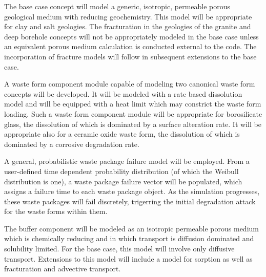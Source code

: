 


      The base case concept will model a generic, isotropic, permeable porous 
      geological medium with reducing geochemistry. This model will be 
      appropriate for clay and salt geologies. The fracturation in the geologies  
      of the granite and deep borehole concepts will not be appropriately 
      modeled in the base case unless an equivalent porous medium calculation is 
      conducted external to the code. The incorporation of fracture models will 
      follow in subsequent extensions to the base case.
  






      A waste form component module capable of modeling two canonical waste
      form concepts will be developed. It will be modeled with a rate based 
      dissolution model and will be equipped with a heat limit which may 
      constrict the waste form loading. Such a waste form component module will 
      be appropriate for borosilicate glass, the dissolution of which is 
      dominated by a surface alteration rate. It will be appropriate also for a 
      ceramic oxide waste form, the dissolution of which is dominated by a 
      corrosive degradation rate.


      
      A general, probabilistic waste package failure model will be employed.  
      From a user-defined time dependent probability distribution (of which the 
      Weibull distribution is one), a waste package failure vector will be 
      populated, which assigns a failure time to each waste package object. As 
      the simulation progresses, these waste packages will fail discretely, 
      trigerring the initial degradation attack for the waste forms within them.

      

      The buffer component will be modeled as an isotropic permeable porous 
      medium which is chemically reducing and in which transport is diffusion 
      dominated  and solubility limited.  For the base case, this model will 
      involve only diffusive transport. Extensions to this model will include a 
      model for sorption as well as fracturation and advective transport.  

